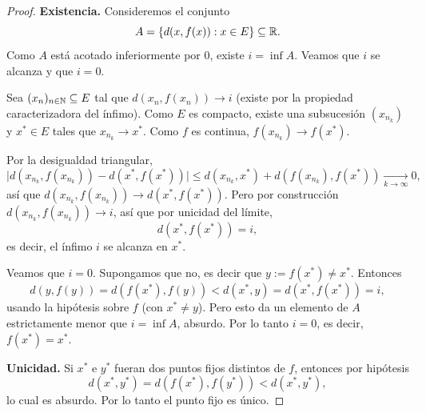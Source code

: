 \begin{proof}
\textbf{Existencia.} Consideremos el conjunto
\[
A = \{d(x,f(x)) : x\in E\} \subseteq \mathbb{R}.
\]
Como $A$ está acotado inferiormente por $0$, existe $i = \inf A$. Veamos
que $i$ se alcanza y que $i=0$.

Sea $(x_n)_{n\in\mathbb{N}}\subseteq E$ tal que $d(x_n,f(x_n)) \to i$ (existe por
la propiedad caracterizadora del ínfimo). Como $E$ es compacto, existe
una subsucesión $(x_{n_k})$ y $x^*\in E$ tales que $x_{n_k}\to x^*$. Como
$f$ es continua, $f(x_{n_k})\to f(x^*)$.

Por la desigualdad triangular,
\[
\bigl|d(x_{n_k},f(x_{n_k})) - d(x^*,f(x^*))\bigr|
\le d(x_{n_k},x^*) + d(f(x_{n_k}),f(x^*)) \xrightarrow[k\to\infty]{} 0,
\]
así que $d(x_{n_k},f(x_{n_k})) \to d(x^*,f(x^*))$. Pero por construcción
$d(x_{n_k},f(x_{n_k})) \to i$, así que por unicidad del límite,
\[
d(x^*,f(x^*)) = i,
\]
es decir, el ínfimo $i$ se alcanza en $x^*$.

Veamos que $i=0$. Supongamos que no, es decir que $y:=f(x^*)\neq x^*$.
Entonces
\[
d(y,f(y)) = d(f(x^*),f(y)) < d(x^*,y) = d(x^*,f(x^*)) = i,
\]
usando la hipótesis sobre $f$ (con $x^*\neq y$). Pero esto da un elemento
de $A$ estrictamente menor que $i=\inf A$, absurdo. Por lo tanto $i=0$,
es decir, $f(x^*)=x^*$.

\textbf{Unicidad.} Si $x^*$ e $y^*$ fueran dos puntos fijos distintos de
$f$, entonces por hipótesis
\[
d(x^*,y^*) = d(f(x^*),f(y^*)) < d(x^*,y^*),
\]
lo cual es absurdo. Por lo tanto el punto fijo es único.
\end{proof}
